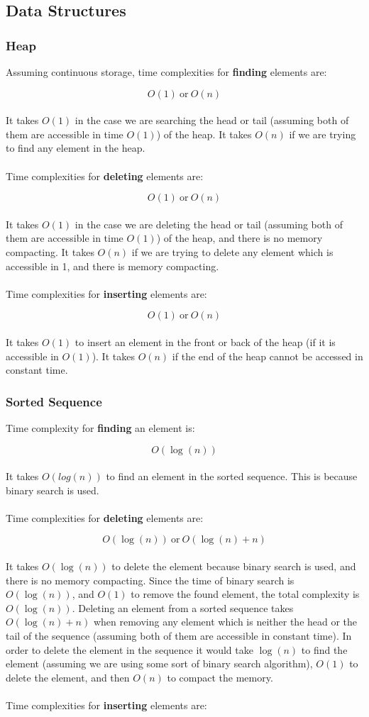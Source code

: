 \documentclass{article}
\begin{document}
\subsection{Data Structures}
\subsubsection{Heap}
Assuming continuous storage, time complexities for \textbf{finding} elements are:

\[ O(1)~\text{or}~O(n) \] \\
It takes $O(1)$ in the case we are searching the head or tail (assuming both of them are accessible in
time $O(1)$) of the heap. It takes $O(n)$ if we are trying to find any element in the heap. \\ \\
Time complexities for \textbf{deleting} elements are:

\[ O(1)~\text{or}~O(n) \] \\
It takes $O(1)$ in the case we are deleting the head or tail (assuming both of them are accessible in
time $O(1)$) of the heap, and there is no memory compacting. It takes $O(n)$ if we are trying to delete any element which is accessible in 1, and there is memory compacting. \\ \\
Time complexities for \textbf{inserting} elements are:

\[ O(1)~\text{or}~O(n) \] \\
It takes $O(1)$ to insert an element in the front or back of the heap (if it is accessible in $O(1)$). It takes $O(n)$ if the end of the heap cannot be accessed in constant time.

\subsubsection{Sorted Sequence}
Time complexity for \textbf{finding} an element is:

\[ O(\log(n)) \] \\
It takes $O(log(n))$ to find an element in the sorted sequence. This is because binary search is used. \\ \\
Time complexities for \textbf{deleting} elements are:

\[ O(\log(n))~\text{or}~O(\log(n) + n) \] \\
It takes $O(\log(n))$ to delete the element because binary search is used, and there is no memory compacting. Since the time of binary search is $O(\log(n))$, and $O(1)$ to remove the found element, the total complexity is $O(\log(n))$. Deleting an element from a sorted sequence takes $O(\log(n) + n)$ when removing any element which is neither the head or the tail of the sequence (assuming both of them are accessible in constant time). In order to delete the element in the sequence it would take $\log(n)$ to find the element (assuming we are using some sort of binary search algorithm), $O(1)$ to delete the element, and then $O(n)$ to compact the memory. \\ \\
Time complexities for \textbf{inserting} elements are:
\end{document}
